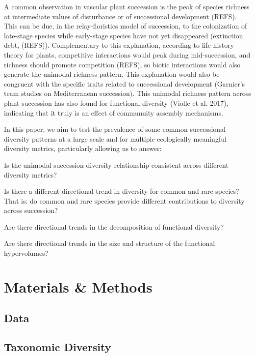\documentclass[a4paper, 9pt]{article}
\newcommand{\refs}{(\alert{REFS})}
\begin{document}
	A common observation in vascular plant succession is the peak of species richness at intermediate values of disturbance or of successional development \refs. This can be due, in the relay-floristics model of succession, to the colonization of late-stage species while early-stage species have not yet disappeared (extinction debt, \refs). Complementary to this explanation, according to life-history theory for plants, competitive interactions would peak during mid-succession, and richness should promote competition \refs, so biotic interactions would also generate the unimodal richness pattern. This explanation would also be congruent with the specific traits related to successional development (\alert{Garnier's team studies on Mediterranean succession}). This unimodal richness pattern across plant succession has also found for functional diversity (\alert{Violle et al. 2017}), indicating that it truly is an effect of communuity assembly mechanisms.
	
	In this paper, we aim to test the prevalence of some common successional diversity patterns at a large scale and for multiple ecologically meaningful diversity metrics, particularly allowing us to answer:
	
	\begin{compactenum}
		\item Is the unimodal succession-diversity relationship consistent across different diversity metrics?
		\item Is there a different directional trend in diversity for common and rare species? That is: do common and rare species provide different contributions to diversity across succession?
		\item Are there directional trends in the decomposition of functional diversity?
		\item Are there directional trends in the size and structure of the functional hypervolumes?
	\end{compactenum}

	\section*{Materials \& Methods}
	\label{sec:mms}
	
	\subsection*{Data}
	

	
	\subsection*{Taxonomic Diversity}
	
\end{document}
